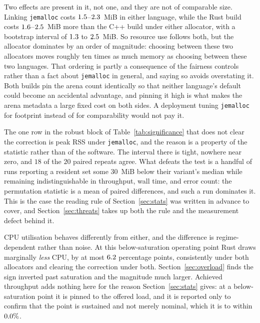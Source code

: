 \documentclass[english,twoside,openright,a4paper,censored,csm,software-track-2020]{HYthesisML}
\begin{document}
Two effects are present in it, not one, and they are not of comparable size. Linking
\texttt{jemalloc} costs $1.5$--$2.3$~MiB in either language, while the Rust
build costs $1.6$--$2.5$~MiB more than the C++ build under either allocator,
with a bootstrap interval of $1.3$ to $2.5$~MiB. So resource use follows both,
but the allocator dominates by an order of magnitude: choosing between these two allocators moves
roughly ten times as much memory as choosing between these two languages. That ordering is partly
a consequence of the fairness controls rather than a fact about \texttt{jemalloc} in general, and
saying so avoids overstating it. Both builds pin the arena count identically so that neither
language's default could become an accidental advantage, and pinning it high is what makes the
arena metadata a large fixed cost on both sides. A deployment tuning \texttt{jemalloc} for
footprint instead of for comparability would not pay it.

The one row in the robust block of Table~\ref{tab:significance} that does not clear the
correction is peak RSS under
\texttt{jemalloc}, and the reason is a property of the statistic rather than of the software. The
interval there is tight, nowhere near zero, and $18$ of the $20$ paired repeats agree. What
defeats the test is a handful of runs reporting a resident set some $30$~MiB below their variant's
median while remaining indistinguishable in throughput, wall time, and error count: the
permutation statistic is a mean of paired differences, and such a run dominates it. This is the case the
reading rule of Section~\ref{sec:stats} was written in advance to cover, and
Section~\ref{sec:threats} takes up both the rule and the measurement defect behind it.

CPU utilisation behaves differently from either, and the difference is regime-dependent rather
than noise. At this below-saturation operating point Rust draws marginally \emph{less} CPU, by at
most $6.2$ percentage points, consistently under both allocators and clearing the
correction under both. Section~\ref{sec:overload} finds the sign inverted past saturation and the
magnitude much larger. Achieved throughput adds nothing here for the reason
Section~\ref{sec:stats} gives: at a below-saturation point it is pinned to the offered load, and
it is reported only to confirm that the point is sustained and not merely nominal, which it is to
within $0.0\%$.
\end{document}
